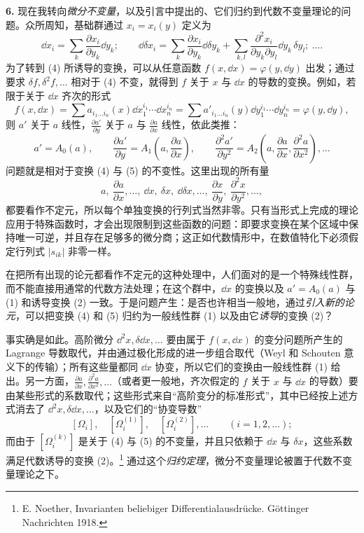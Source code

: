 \textbf{6.} 现在我转向\emph{微分不变量}，以及引言中提出的、它们归约到代数不变量理论的问题。众所周知，基础群通过 $x_i=x_i(y)$ 定义为
\[
\tag{4}
\dd x_i=\sum_k \frac{\partial x_i}{\partial y_k}\dd y_k;\qquad
\dd\delta x_i=\sum_k \frac{\partial x_i}{\partial y_k}\dd\delta y_k+
\sum_{k,l}\frac{\partial^2 x_i}{\partial y_k\partial y_l}\dd y_k\,\delta y_l;\ \ldots .
\]
为了转到 (4) 所诱导的变换，可以从任意函数 $f(x,\dd x)=\varphi(y,\dd y)$ 出发；通过要求 $\delta f,\delta^2f,\ldots$ 相对于 (4) 不变，就得到 $f$ 关于 $x$ 与 $\dd x$ 的导数的变换。例如，若限于关于 $\dd x$ 齐次的形式
\[
 f(x,\dd x)=\sum a_{i_1\ldots i_n}(x)\dd x_1^{i_1}\cdots\dd x_n^{i_n}
 =\sum a'_{i_1\ldots i_n}(y)\dd y_1^{i_1}\cdots\dd y_n^{i_n}
 =\varphi(y,\dd y),
\]
则 $a'$ 关于 $a$ 线性，$\frac{\partial a'}{\partial y}$ 关于 $a$ 与 $\frac{\partial a}{\partial x}$ 线性，依此类推：
\[
\tag{5}
a'=A_0(a),\qquad
\frac{\partial a'}{\partial y}=A_1\!\left(a,\frac{\partial a}{\partial x}\right),\qquad
\frac{\partial^2 a'}{\partial y^2}=A_2\!\left(a,\frac{\partial a}{\partial x},\frac{\partial^2 a}{\partial x^2}\right),\ldots
\]
问题就是相对于变换 (4) 与 (5) 的不变性。这里出现的所有量
\[
a,\ \frac{\partial a}{\partial x},\ldots,\ \dd x,\ \delta x,\ \dd\delta x,\ldots,\ 
\frac{\partial x}{\partial y},\ \frac{\partial^2 x}{\partial y^2},\ldots,
\]
都要看作不定元，所以每个单独变换的行列式当然非零。只有当形式上完成的理论应用于特殊函数时，才会出现限制到这些函数的问题：即要求变换在某个区域中保持唯一可逆，并且存在足够多的微分商；这正如代数情形中，在数值特化下必须假定行列式 $|s_{ik}|$ 非零一样。

在把所有出现的论元都看作不定元的这种处理中，人们面对的是一个特殊线性群，而不能直接用通常的代数方法处理；在这个群中，$\dd x$ 的变换以及 $a'=A_0(a)$ 与 (1) 和诱导变换 (2) 一致。于是问题产生：是否也许相当一般地，通过\emph{引入新的论元}，可以把变换 (4) 和 (5) 归约为一般线性群 (1) 以及由它\emph{诱导}的变换 (2)？

事实确是如此。高阶微分 $\dd^2x,\delta\dd x,\ldots$ 要由属于 $f(x,\dd x)$ 的变分问题所产生的 Lagrange 导数取代，并由通过极化形成的进一步组合取代（Weyl 和 Schouten 意义下的传输）；所有这些量都同 $\dd x$ 协变，所以它们的变换由一般线性群 (1) 给出。另一方面，$\frac{\partial a}{\partial x},\frac{\partial^2a}{\partial x^2},\ldots$（或者更一般地，齐次假定的 $f$ 关于 $x$ 与 $\dd x$ 的导数）要由某些形式的系数取代；这些形式来自“高阶变分的标准形式”，其中已经按上述方式消去了 $\dd^2x,\delta\dd x,\ldots$，以及它们的“协变导数”
\[
 [\Omega_i],\quad [\Omega_i^{(1)}],\quad [\Omega_i^{(2)}],\ldots\qquad (i=1,2,\ldots);
\]
而由于 $[\Omega_i^{(k)}]$ 是关于 (4) 与 (5) 的不变量，并且只依赖于 $\dd x$ 与 $\delta x$，这些系数满足代数诱导的变换 (2)。\footnote{E. Noether, Invarianten beliebiger Differentialausdrücke. Göttinger Nachrichten 1918.} 通过这个\emph{归约定理}，微分不变量理论被置于代数不变量理论之下。

